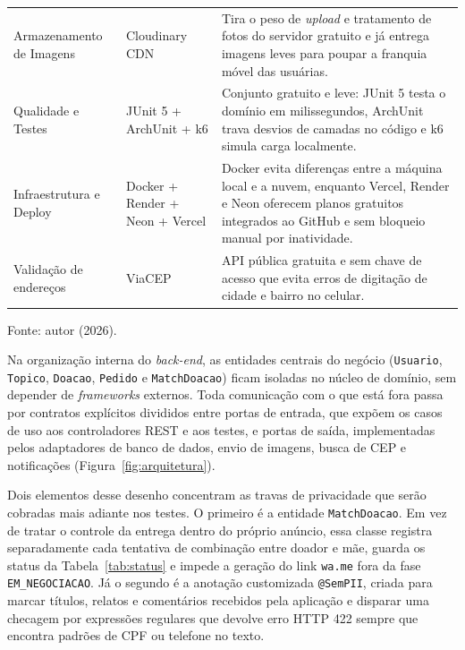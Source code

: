 \begin{table}[H]
\begin{tabular}{p{3.3cm}p{3.9cm}p{7.5cm}}
\addlinespace[3pt]
Armazenamento de Imagens & Cloudinary CDN & Tira o peso de \textit{upload} e tratamento de fotos do servidor gratuito e já entrega imagens leves para poupar a franquia móvel das usuárias. \\
\addlinespace[3pt]
Qualidade e Testes & JUnit 5 + ArchUnit + k6 & Conjunto gratuito e leve: JUnit 5 testa o domínio em milissegundos, ArchUnit trava desvios de camadas no código e k6 simula carga localmente. \\
\addlinespace[3pt]
Infraestrutura e Deploy & Docker + Render + Neon + Vercel & Docker evita diferenças entre a máquina local e a nuvem, enquanto Vercel, Render e Neon oferecem planos gratuitos integrados ao GitHub e sem bloqueio manual por inatividade. \\
\addlinespace[3pt]
Validação de endereços & ViaCEP & API pública gratuita e sem chave de acesso que evita erros de digitação de cidade e bairro no celular. \\
\bottomrule
\end{tabular}
\vspace{0.15cm}

{\small Fonte: autor (2026).}
\end{table}

Na organização interna do \textit{back-end}, as entidades centrais do negócio (\texttt{Usuario}, \texttt{Topico}, \texttt{Doacao}, \texttt{Pedido} e \texttt{MatchDoacao}) ficam isoladas no núcleo de domínio, sem depender de \textit{frameworks} externos. Toda comunicação com o que está fora passa por contratos explícitos divididos entre portas de entrada, que expõem os casos de uso aos controladores REST e aos testes, e portas de saída, implementadas pelos adaptadores de banco de dados, envio de imagens, busca de CEP e notificações (Figura~\ref{fig:arquitetura}).



Dois elementos desse desenho concentram as travas de privacidade que serão cobradas mais adiante nos testes. O primeiro é a entidade \texttt{MatchDoacao}. Em vez de tratar o controle da entrega dentro do próprio anúncio, essa classe registra separadamente cada tentativa de combinação entre doador e mãe, guarda os status da Tabela~\ref{tab:status} e impede a geração do link \texttt{wa.me} fora da fase \texttt{EM\_NEGOCIACAO}. Já o segundo é a anotação customizada \texttt{@SemPII}, criada para marcar títulos, relatos e comentários recebidos pela aplicação e disparar uma checagem por expressões regulares que devolve erro HTTP 422 sempre que encontra padrões de CPF ou telefone no texto.

